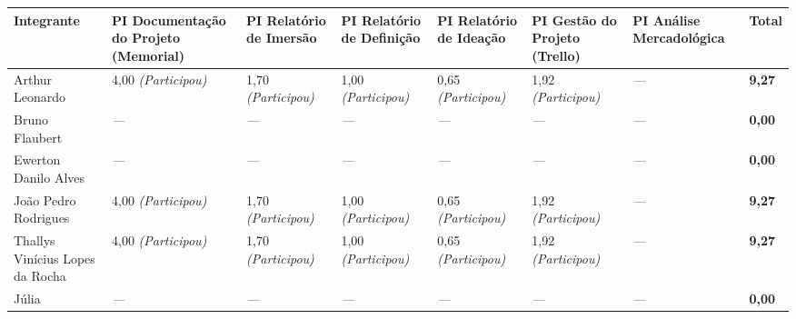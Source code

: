\documentclass[
  sigconf,
  nonacm, %
  language=portuguese
]{acmart}
\begin{document}
\begin{tabularx}{\linewidth}{@{} X X X X X X X p{2.5cm} @{}}
\toprule
\textbf{Integrante} & \textbf{\small PI Documentação do Projeto (Memorial)} & \textbf{\small PI Relatório de Imersão} & \textbf{\small PI Relatório de Definição} & \textbf{\small PI Relatório de Ideação} & \textbf{\small PI Gestão do Projeto (Trello)} & \textbf{\small PI Análise Mercadológica} & \textbf{Total} \\
\midrule
Arthur Leonardo  & 4,00 \textit{(Participou)} & 1,70 \textit{(Participou)} & 1,00 \textit{(Participou)} & 0,65 \textit{(Participou)} & 1,92 \textit{(Participou)} & \textit{---} & \textbf{9,27} \\
Bruno Flaubert & \textit{---} & \textit{---} & \textit{---} & \textit{---} & \textit{---} & \textit{---} & \textbf{0,00} \\
Ewerton Danilo Alves & \textit{---} & \textit{---} & \textit{---} & \textit{---} & \textit{---} & \textit{---} & \textbf{0,00} \\
João Pedro Rodrigues & 4,00 \textit{(Participou)} & 1,70 \textit{(Participou)} & 1,00 \textit{(Participou)} & 0,65 \textit{(Participou)} & 1,92 \textit{(Participou)} & \textit{---} & \textbf{9,27} \\
Thallys Vinícius Lopes da Rocha & 4,00 \textit{(Participou)} & 1,70 \textit{(Participou)} & 1,00 \textit{(Participou)} & 0,65 \textit{(Participou)} & 1,92 \textit{(Participou)} & \textit{---} & \textbf{9,27} \\
Júlia & \textit{---} & \textit{---} & \textit{---} & \textit{---} & \textit{---} & \textit{---} & \textbf{0,00} \\
\bottomrule
\end{tabularx}
\end{document}
